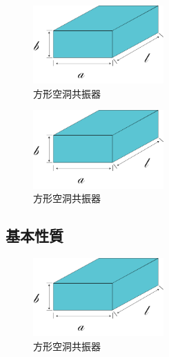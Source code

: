 \vspace{10 mm}

\begin{figure}[h]
  \begin{center}
    \includegraphics[width=5cm]{./image/空洞共振器.png}
    \caption{方形空洞共振器}
    \label{fig:Cavity}
  \end{center}
\end{figure}

\vspace{10 mm}

\begin{figure}[h]
  \begin{center}
    \includegraphics[width=5cm]{./image/空洞共振器.png}
    \caption{方形空洞共振器}
    \label{fig:Cavity}
  \end{center}
\end{figure}

\subsection{基本性質}
\vspace{10 mm}

\begin{figure}[h]
  \begin{center}
    \includegraphics[width=5cm]{./image/空洞共振器.png}
    \caption{方形空洞共振器}
    \label{fig:Cavity}
  \end{center}
\end{figure}

\vspace{10 mm}

